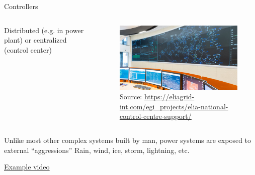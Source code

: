 \begin{frame}{Controllers}
  \begin{columns}
    \begin{column}{0.4\textwidth}
      Distributed (e.g. in power plant) or centralized (control center)
    \end{column}
    \begin{column}{0.55\textwidth}
      \begin{figure}
      \centering
      \includegraphics[width=\linewidth]{images/control-room-640x350-1.jpg}
      \caption*{\small{Source: \url{https://eliagrid-int.com/egi_projects/elia-national-control-centre-support/}}}
      \end{figure}
    \end{column}
    \end{columns}
\end{frame}

\begin{frame}
{Unlike most other complex systems built by man, power systems are exposed to external “aggressions”}
 Rain, wind, ice, storm, lightning, etc.
\begin{center}
\href{https://www.youtube.com/embed/bSSO5XT1k1I}{\underline{Example video}}
\end{center}
\end{frame}

